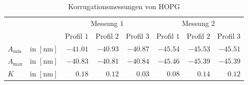 \documentclass[12pt,a4paper]{scrartcl}
\numberwithin{equation}{section} %
\begin{document}
\begin{table}[h!]
	\centering
	\begin{tabular}{lr|rrr|rrr}
		&& \multicolumn{3}{c}{Messung $1$} \vline& \multicolumn{3}{c}{Messung $2$} \\
		&& Profil $1$ & Profil $2$ & Profil $3$ & Profil $1$ & Profil $2$ & Profil $3$ \\
		\hline
		
		$A_\mathrm{min}$ &in $[\mathrm{nm}]$
			& $-41.01$ & $-40.93$ & $-40.87$
			& $-45.54$ & $-45.53$ & $-45.51$
			\\
		$A_\mathrm{max}$ &in $[\mathrm{nm}]$
			& $-40.83$ & $-40.81$ & $-40.84$
			& $-45.46$ & $-45.39$ & $-45.39$
			\\
		$K$  &in $[\mathrm{nm}]$
			& $0.18$ & $0.12$ & $0.03$
			& $0.08$ & $0.14$ & $0.12$
	\end{tabular}
	\caption{Korrugationsmessungen von HOPG}
	\label{table:Korrugation}
\end{table}
\end{document}
